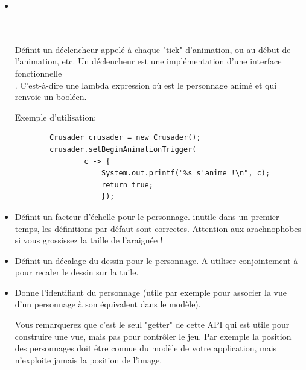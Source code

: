 \documentclass[11pt]{article}
\begin{document}
\begin{itemize}
    \item {}\\
    \\
    \\

        Définit un déclencheur appelé à chaque "tick" d'animation, ou au début de l'animation, etc.
        Un déclencheur est une implémentation d'une interface fonctionnelle \\. 
        C'est-à-dire une lambda expression  où  est le personnage animé et qui renvoie un booléen.

        Exemple d'utilisation:

    \begin{lstlisting}
        Crusader crusader = new Crusader();
        crusader.setBeginAnimationTrigger(
                c -> {
                    System.out.printf("%s s'anime !\n", c);
                    return true;
                    });
    \end{lstlisting}

    \item {}

        Définit un facteur d'échelle pour le personnage. inutile dans un premier temps, les définitions par défaut sont correctes.
        Attention aux arachnophobes si vous grossissez la taille de l'araignée !

    \item {}

        Définit un décalage du dessin pour le personnage. A utiliser conjointement à  pour recaler le dessin sur la tuile.

    \item {}

    Donne l'identifiant du personnage (utile par exemple pour associer la vue d'un personnage à son équivalent dans le modèle).

    Vous remarquerez que c'est le seul "getter" de cette API qui est utile pour construire une vue, mais pas pour contrôler le jeu. Par exemple la position des personnages doit être connue du modèle de votre application, mais n'exploite jamais la position de l'image.

\end{itemize}   
\end{document}

